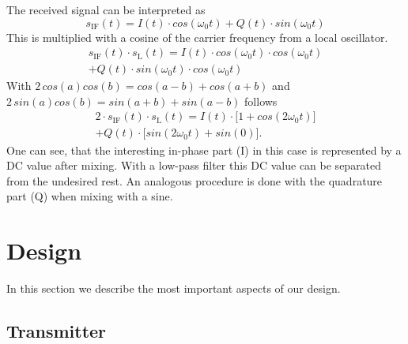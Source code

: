 \documentclass[conference]{IEEEtran}
\begin{document}
The received signal can be interpreted as
\begin{equation}
	s_{\text{IF}}(t)=I(t) \cdot cos(\omega_{0}t) + Q(t) \cdot sin(\omega_{0}t)
\end{equation}     
This is multiplied with a cosine of the carrier frequency from a local oscillator.
\begin{multline}
        s_{\text{IF}}(t) \cdot s_{\text{L}}(t) = I(t) \cdot cos(\omega_{0}t) \cdot cos(\omega_{0}t)\\+ Q(t) \cdot sin(\omega_{0}t) \cdot cos(\omega_{0}t)
\end{multline}
With \ensuremath{2\,cos(a)cos(b)=cos(a-b)+cos(a+b)} and \ensuremath{2\,sin(a)cos(b)=sin(a+b)+sin(a-b)} follows
\begin{multline}
        2 \cdot s_{\text{IF}}(t) \cdot s_{\text{L}}(t) = I(t) \cdot \bigl[1+cos(2\omega_{0}t)\bigr]\\+ Q(t) \cdot \bigl[sin(2\omega_0t)+sin(0)\bigr].
\end{multline}
One can see, that the interesting in-phase part (I) in this case is
represented by a DC value after mixing. With a low-pass filter this DC
value can be separated from the undesired rest. An analogous procedure
is done with the quadrature part (Q) when mixing with a sine.

\section{Design}

In this section we describe the most important aspects of our design.

\subsection{Transmitter}
 
\end{document}
